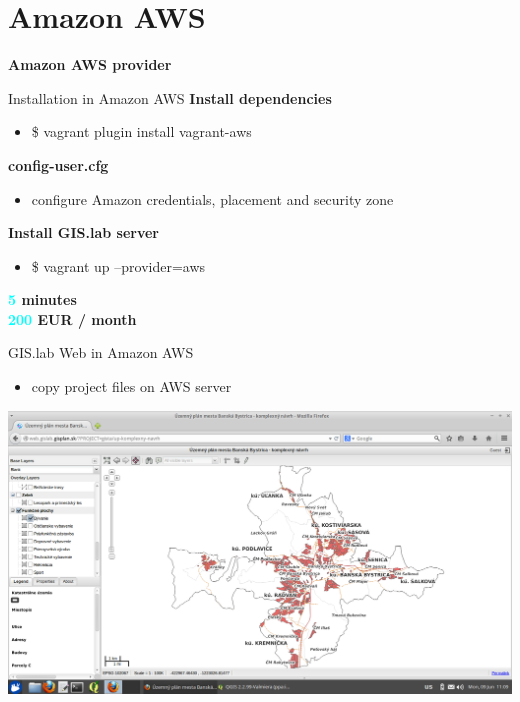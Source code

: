 \documentclass[12pt]{beamer}
\begin{document}
\section{Amazon AWS}
\begin{frame}
	\begin{center}
		\LARGE\textbf{Amazon AWS provider}
	\end{center}
\end{frame}


\begin{frame}{Installation in Amazon AWS}
	\textbf{Install dependencies}
	\begin{itemize}
		\item \$ vagrant plugin install vagrant-aws
	\end{itemize}

	\textbf{config-user.cfg}
	\begin{itemize}
		\item configure Amazon credentials, placement and security zone
	\end{itemize}

	\textbf{Install GIS.lab server}
	\begin{itemize}
		\item \$ vagrant up --provider=aws
	\end{itemize}
	
	\begin{flushleft}
		\textbf{\textcolor{Cyan}{5} minutes} \\
		\textbf{\textcolor{Cyan}{200} EUR / month} \\
	\end{flushleft}
\end{frame}


\begin{frame}{GIS.lab Web in Amazon AWS}
	\begin{itemize}
		\item copy project files on AWS server
	\end{itemize}
	\begin{center}
		\includegraphics[keepaspectratio=true,height=0.7\textheight]{images/real-world-example/project-gislab-web-amazon-aws.png}
	\end{center}
\end{frame}
\end{document}
